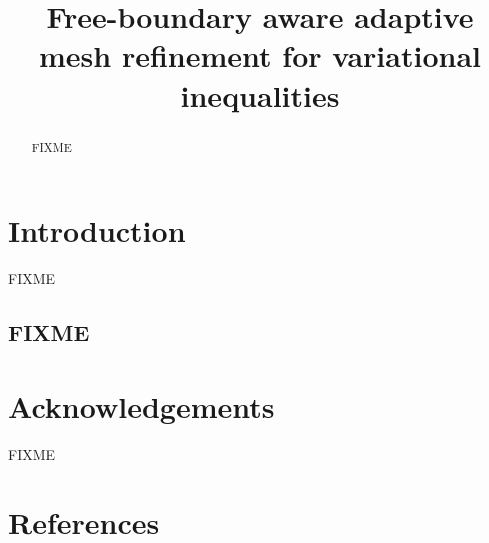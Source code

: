 \documentclass[]{interact}
\theoremstyle{plain}%
\theoremstyle{definition}
\theoremstyle{remark}
\begin{document}

\title{Free-boundary aware adaptive mesh refinement for variational inequalities}

\author{
}

\maketitle

\begin{abstract}
FIXME
\end{abstract}



\section{Introduction} \label{sec:intro}

FIXME


\subsection{FIXME} \label{sec:nextsec}



\section*{Acknowledgements}

FIXME




\section{References}
\end{document}
